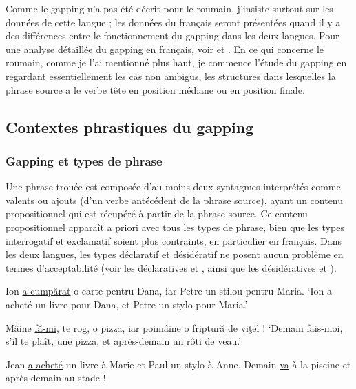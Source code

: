 Comme le gapping n’a pas été décrit pour le roumain, j’insiste surtout sur les données de cette langue ; les données du français seront présentées quand il y a des différences entre le fonctionnement du gapping dans les deux langues. Pour une analyse détaillée du gapping en français, voir \citet{AbeilleEtAl2010} et \citet{AbeilleEtAl2014}. En ce qui concerne le roumain, comme je l’ai mentionné plus haut, je commence l’étude du gapping en regardant essentiellement les cas non ambigus, {\cad} les structures dans lesquelles la phrase source a le verbe tête en position médiane ou en position finale.


\subsection{Contextes phrastiques du gapping} \label{ch2:sect2.3.1}

\subsubsection{Gapping et types de phrase}

Une phrase trouée est composée d’au moins deux syntagmes interprétés comme valents ou ajouts (d’un verbe antécédent de la phrase source), ayant un contenu propositionnel qui est récupéré à partir de la phrase source. Ce contenu propositionnel apparaît a priori avec tous les types de phrase, bien que les types interrogatif et exclamatif soient plus contraints, en particulier en français. Dans les deux langues, les types déclaratif et désidératif ne posent aucun problème en termes d’acceptabilité (voir les déclaratives  et , ainsi que les désidératives  et ). 

\ea
\ea Ion \uline{a cumpărat} o carte pentru Dana, iar Petre un stilou pentru Maria. \label{ch2:ex22a}
\glt  ‘Ion a acheté un livre pour Dana, et Petre un stylo pour Maria.’   

\ex  Mâine \uline{fă-mi}, te rog, o pizza, iar poimâine o friptură de viţel ! \label{ch2:ex22b}
\glt  ‘Demain fais-moi, s’il te plaît, une pizza, et après-demain un rôti de veau.’ 
\z
\z


\ea
\ea  Jean \uline{a acheté} un livre à Marie et Paul un stylo à Anne. \label{ch2:ex23a}
\ex Demain \uline{va} à la piscine et après-demain au stade ! \label{ch2:ex23b}
\z
\z

